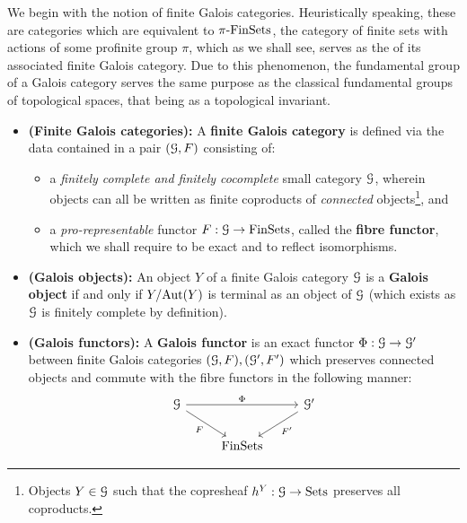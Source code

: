             We begin with the notion of finite Galois categories. Heuristically speaking, these are categories which are equivalent to $\pi\text{-}\mathrm{Fin}\mathrm{Sets}$, the category of finite sets with actions of some profinite group $\pi$, which as we shall see, serves as the  of its associated finite Galois category. Due to this phenomenon, the fundamental group of a Galois category serves the same purpose as the classical fundamental groups of topological spaces, that being as a topological invariant. 
            \begin{definition} \label{def: finite_galois_categories}
                \noindent
                \begin{itemize}
                    \item \textbf{(Finite Galois categories):} A \textbf{finite Galois category} is defined via the data contained in a pair $(\mathcal{G}, F)$ consisting of:
                    \begin{itemize}
                        \item a \textit{finitely complete and finitely cocomplete} small category $\mathcal{G}$, wherein objects can all be written as finite coproducts of \textit{connected} objects\footnote{Objects $Y \in \mathcal{G}$ such that the copresheaf $h^Y: \mathcal{G} \to \mathrm{Sets}$ preserves all coproducts.}, and
                        \item a \textit{pro-representable} functor $F: \mathcal{G} \to \mathrm{Fin}\mathrm{Sets}$, called the \textbf{fibre functor}, which we shall require to be exact and to reflect isomorphisms.
                    \end{itemize}
                    \item \textbf{(Galois objects):} An object $Y$ of a finite Galois category $\mathcal{G}$ is a \textbf{Galois object} if and only if $Y/\mathrm{Aut}(Y)$ is terminal as an object of $\mathcal{G}$ (which exists as $\mathcal{G}$ is finitely complete by definition).
                    \item \textbf{(Galois functors):} A \textbf{Galois functor} is an exact functor $\Phi: \mathcal{G} \to \mathcal{G}'$ between finite Galois categories $(\mathcal{G}, F), (\mathcal{G}', F')$ which preserves connected objects and commute with the fibre functors in the following manner:
                        $$
                            \begin{tikzcd}
                            	\calG && {\calG'} \\
                            	& \Fin\Sets
                            	\arrow["F"', from=1-1, to=2-2]
                            	\arrow["{F'}", from=1-3, to=2-2]
                            	\arrow["\Phi", from=1-1, to=1-3]
                            \end{tikzcd}
                        $$
                \end{itemize}
            \end{definition}
